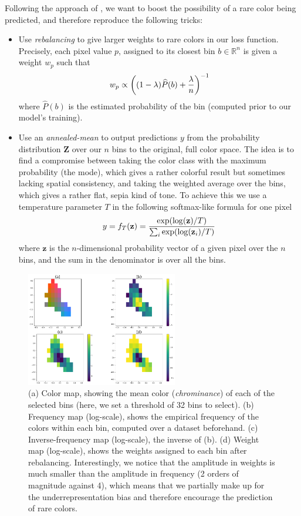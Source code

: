 \documentclass[10pt,twocolumn,letterpaper]{article}
\begin{document}
Following the approach of \cite{zhang2016colorful}, we want to boost the possibility of a rare color being predicted, and therefore reproduce the following tricks:
\begin{itemize}
\item Use \textit{rebalancing} to give larger weights to rare colors in our loss function. Precisely, each pixel value $p$, assigned to its closest bin $b \in \mathbb{R}^n$ is given a weight $w_p$ such that $$w_p \propto \left( (1-\lambda) \widehat{P}(b) + {\lambda \over n} \right)^{-1}$$ where $\widehat{P}(b)$ is the estimated probability of the bin (computed prior to our model's training).
\item Use an \textit{annealed-mean} to output predictions $y$ from the probability distribution $\textbf{Z}$ over our $n$ bins to the original, full color space. The idea is to find a compromise between taking the color class with the maximum probability (the mode), which gives a rather colorful result but sometimes lacking spatial consistency, and taking the weighted average over the bins, which gives a rather flat, sepia kind of tone. To achieve this we use a temperature parameter $T$ in the following softmax-like formula for one pixel $$y = f_T(\textbf{z}) = {\exp(\log(\textbf{z}) / T) \over \sum_i \exp(\log(\textbf{z}_i) / T)}$$ where $\textbf{z}$ is the $n$-dimensional probability vector of a given pixel over the $n$ bins, and the sum in the denominator is over all the bins.
\end{itemize}

\begin{figure}
\begin{center}
\includegraphics[width=250px]{img/cdexample.png}
\caption{(a) Color map, showing the mean color (\textit{chrominance}) of each of the selected bins (here, we set a threshold of 32 bins to select). (b) Frequency map (log-scale), shows the empirical frequency of the colors within each bin, computed over a dataset beforehand. (c) Inverse-frequency map (log-scale), \ie the inverse of (b). (d) Weight map (log-scale), shows the weights assigned to each bin after rebalancing. Interestingly, we notice that the amplitude in weights is much smaller than the amplitude in frequency (2 orders of magnitude against 4), which means that we partially make up for the underrepresentation bias and therefore encourage the prediction of rare colors.}
\label{cdex}
\end{center}
\end{figure}
\end{document}
